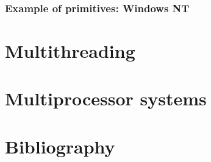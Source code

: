 
\begin{frame}
  \frametitle{Example of primitives: Windows NT}
\end{frame}

%
%

\section{Multithreading}

%
%

\section{Multiprocessor systems}

%
%

\section{Bibliography}

\begin{thebibliography}{4}


\end{thebibliography}



